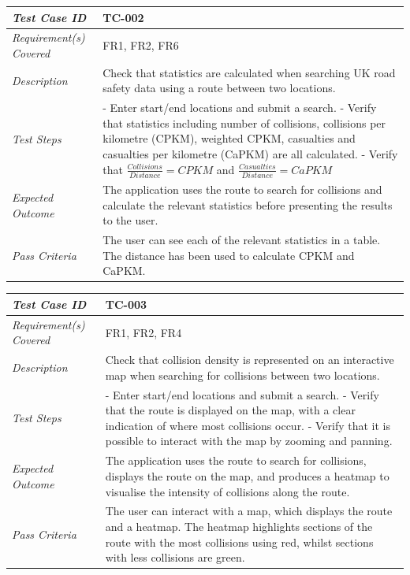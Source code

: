 \documentclass[authoryearcitations]{UoYCSproject}
\begin{document}
\begin{tabular}{| p{2.5cm} | p{11cm} |}
	\hline
	\textit{Test Case ID} & TC-002 \\ \hline
	\textit{Requirement(s) Covered} & FR1, FR2, FR6 \\ \hline
	\textit{Description} & Check that statistics are calculated when searching UK road safety data using a route between two locations.  \\ \hline
	\textit{Test Steps}& - Enter start/end locations and submit a search.
	\newline - Verify that statistics including number of collisions, collisions per kilometre (CPKM), weighted CPKM, casualties and casualties per kilometre (CaPKM) are all calculated.
	\newline - Verify that $\frac{Collisions}{Distance} = CPKM $ and $\frac{Casualties}{Distance} = CaPKM$
 \\ \hline
	\textit{Expected Outcome} & The application uses the route to search for collisions and calculate the relevant statistics before presenting the results to the user.  \\ \hline
	\textit{Pass Criteria} & The user can see each of the relevant statistics in a table. The distance has been used to calculate CPKM and CaPKM. \\ \hline
\end{tabular}


\begin{tabular}{| p{2.5cm} | p{11cm} |}
	\hline
	\textit{Test Case ID} & TC-003 \\ \hline
	\textit{Requirement(s) Covered} & FR1, FR2, FR4 \\ \hline
	\textit{Description} & Check that collision density is represented on an interactive map when searching for collisions between two locations.  \\ \hline
	\textit{Test Steps}& - Enter start/end locations and submit a search.
	\newline - Verify that the route is displayed on the map, with a clear indication of where most collisions occur.
	\newline - Verify that it is possible to interact with the map by zooming and panning. 
 \\ \hline
	\textit{Expected Outcome} & The application uses the route to search for collisions, displays the route on the map, and produces a heatmap to visualise the intensity of collisions along the route.  \\ \hline
	\textit{Pass Criteria} & The user can interact with a map, which displays the route and a heatmap. The heatmap highlights sections of the route with the most collisions using red, whilst sections with less collisions are green.  \\ \hline
\end{tabular}
\end{document}
